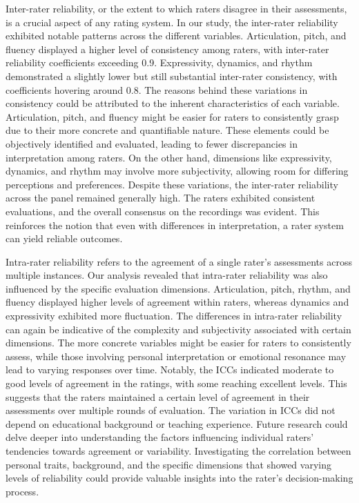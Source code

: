 Inter-rater reliability, or the extent to which raters disagree in their assessments, is a crucial aspect of any rating system. In our study, the inter-rater reliability exhibited notable patterns across the different variables. Articulation, pitch, and fluency displayed a higher level of consistency among raters, with inter-rater reliability coefficients exceeding 0.9. Expressivity, dynamics, and rhythm demonstrated a slightly lower but still substantial inter-rater consistency, with coefficients hovering around 0.8.
The reasons behind these variations in consistency could be attributed to the inherent characteristics of each variable. Articulation, pitch, and fluency might be easier for raters to consistently grasp due to their more concrete and quantifiable nature. These elements could be objectively identified and evaluated, leading to fewer discrepancies in interpretation among raters. On the other hand, dimensions like expressivity, dynamics, and rhythm may involve more subjectivity, allowing room for differing perceptions and preferences.
Despite these variations, the inter-rater reliability across the panel remained generally high. The raters exhibited consistent evaluations, and the overall consensus on the recordings was evident. This reinforces the notion that even with differences in interpretation, a rater system can yield reliable outcomes.


Intra-rater reliability refers to the agreement of a single rater's assessments across multiple instances. Our analysis revealed that intra-rater reliability was also influenced by the specific evaluation dimensions. Articulation, pitch, rhythm, and fluency displayed higher levels of agreement within raters, whereas dynamics and expressivity exhibited more fluctuation.
The differences in intra-rater reliability can again be indicative of the complexity and subjectivity associated with certain dimensions. The more concrete variables might be easier for raters to consistently assess, while those involving personal interpretation or emotional resonance may lead to varying responses over time.
Notably, the ICCs indicated moderate to good levels of agreement in the ratings, with some reaching excellent levels. This suggests that the raters maintained a certain level of agreement in their assessments over multiple rounds of evaluation. The variation in ICCs did not depend on educational background or teaching experience. 
Future research could delve deeper into understanding the factors influencing individual raters' tendencies towards agreement or variability. Investigating the correlation between personal traits, background, and the specific dimensions that showed varying levels of reliability could provide valuable insights into the rater's decision-making process.

